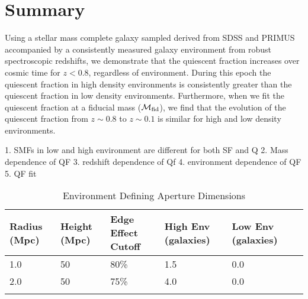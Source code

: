 \documentclass{emulateapj}
\begin{document}
\section{Summary} \label{sec:summary}
Using a stellar mass complete galaxy sampled derived from SDSS and PRIMUS accompanied by a consistently measured galaxy environment from robust spectroscopic redshifts, we demonstrate that the quiescent fraction increases over cosmic time for $ z < 0.8$, regardless of environment. During this epoch the quiescent fraction in high density environments is consistently greater than the quiescent fraction in low density environments. Furthermore, when we fit the quiescent fraction at a fiducial mass ($\mathcal{M}_{\rm{fid}}$), we find that the evolution of the quiescent fraction from $z \sim 0.8$ to $z \sim 0.1$ is similar for high and low density environments. 


1. SMFs in low and high environment are different for both SF and Q
2. Mass dependence of QF
3. redshift dependence of Qf
4. environment dependence of QF
5. QF fit 

%
%


\appendix
\begin{table*} %
  \caption{Environment Defining Aperture Dimensions}
  \label{tab:aperture}
  \begin{center}
    \leavevmode
    \begin{tabular}{llllll} \hline \hline              
  Radius (Mpc)          &Height (Mpc)      & Edge Effect Cutoff &High Env (galaxies) &Low Env (galaxies) \\ \hline 
  1.0 &50 & 80\% & 1.5 & 0.0          \\
  2.0 &50 & 75\% & 4.0 & 0.0          \\ \hline
  \multicolumn{5}{l}{}                                             \\       
    \end{tabular}
  \end{center}
\end{table*}
\end{document}

